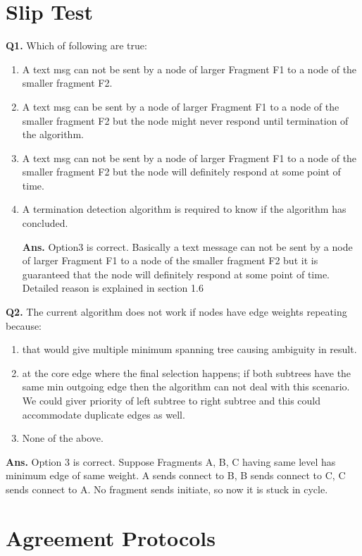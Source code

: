 \documentclass[twoside]{article}
\begin{document}
\section{Slip Test}

\textbf{Q1.} Which of following are true:

\begin{enumerate}
\item A text msg can not be sent by a node of larger Fragment F1 to a node of the smaller fragment F2.
\item A text msg can be sent by a node of larger Fragment F1 to a node of the smaller fragment F2 but the node might never respond until termination of the algorithm.
\item A text msg can not be sent by a node of larger Fragment F1 to a node of the smaller fragment F2 but the node will definitely respond at some point of time.
\item A termination detection algorithm is required to know if the algorithm has concluded.

\textbf{Ans.} Option3 is correct. Basically a text message can not be sent by a node of larger Fragment F1 to a node of the smaller fragment F2 but it is guaranteed that the node will definitely respond at some point of time. Detailed reason is explained in section 1.6
\end{enumerate}

\textbf{Q2.} The current algorithm does not work if nodes have edge weights repeating because:
\begin{enumerate}
\item that would give multiple minimum spanning tree causing ambiguity in result.
\item at the core edge where the final selection happens; if both subtrees have the same min outgoing edge then the algorithm can not deal with this scenario. We could giver priority of left subtree to right subtree and this could accommodate duplicate edges as well.
\item None of the above.
\end{enumerate}

\textbf{Ans.} Option 3 is correct. Suppose Fragments A, B, C having same level has minimum edge of same weight. A sends connect to B, B sends connect to C, C sends connect to A. No fragment sends initiate, so now it is stuck in cycle.

\section{Agreement Protocols}
\end{document}
